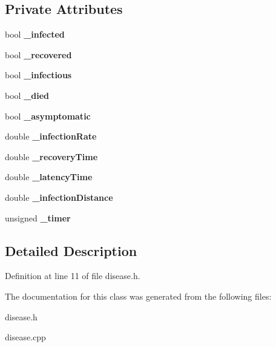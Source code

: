 \subsection*{Private Attributes}
\begin{DoxyCompactItemize}
\item 
\mbox{\label{classdisease_ae2e024b1565492d53e22ae853a54076b}} 
bool {\bfseries \+\_\+infected}
\item 
\mbox{\label{classdisease_a4cef9a43e687cce66a6e083f4cbcc759}} 
bool {\bfseries \+\_\+recovered}
\item 
\mbox{\label{classdisease_a1c050964c5b68ec72ef15bfd41e45c45}} 
bool {\bfseries \+\_\+infectious}
\item 
\mbox{\label{classdisease_a9893b408c1f6daccb8a00a07696b45ab}} 
bool {\bfseries \+\_\+died}
\item 
\mbox{\label{classdisease_a5985d317c6b0890c7f99ec71542b3e04}} 
bool {\bfseries \+\_\+asymptomatic}
\item 
\mbox{\label{classdisease_a12c3fe5e2b7973fdab73be57ea35bf02}} 
double {\bfseries \+\_\+infection\+Rate}
\item 
\mbox{\label{classdisease_ad023af323ca4a780b6287244f34a6aaa}} 
double {\bfseries \+\_\+recovery\+Time}
\item 
\mbox{\label{classdisease_a4e074e57f0b2c8c4b8a6534f5801c426}} 
double {\bfseries \+\_\+latency\+Time}
\item 
\mbox{\label{classdisease_a72c1334514dc57ac05849ece61ee183d}} 
double {\bfseries \+\_\+infection\+Distance}
\item 
\mbox{\label{classdisease_a567c5cc74c752810c746800ab6df53ae}} 
unsigned {\bfseries \+\_\+timer}
\end{DoxyCompactItemize}


\subsection{Detailed Description}


Definition at line 11 of file disease.\+h.



The documentation for this class was generated from the following files\+:\begin{DoxyCompactItemize}
\item 
disease.\+h\item 
disease.\+cpp\end{DoxyCompactItemize}
